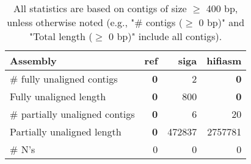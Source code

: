 \documentclass[12pt,a4paper]{article}
\begin{document}
\begin{table}[ht]
\begin{center}
\caption{All statistics are based on contigs of size $\geq$ 400 bp, unless otherwise noted (e.g., "\# contigs ($\geq$ 0 bp)" and "Total length ($\geq$ 0 bp)" include all contigs).}
\begin{tabular}{|l*{3}{|r}|}
\hline
Assembly & ref & siga & hifiasm \\ \hline
\# fully unaligned contigs & {\bf 0} & 2 & {\bf 0} \\ \hline
Fully unaligned length & {\bf 0} & 800 & {\bf 0} \\ \hline
\# partially unaligned contigs & {\bf 0} & 6 & 20 \\ \hline
Partially unaligned length & {\bf 0} & 472837 & 2757781 \\ \hline
\# N's & 0 & 0 & 0 \\ \hline
\end{tabular}
\end{center}
\end{table}
\end{document}
